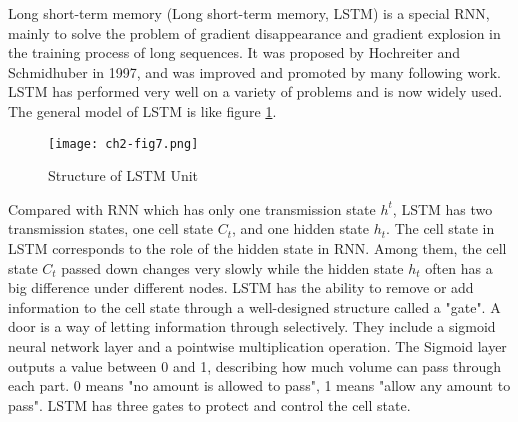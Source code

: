Long short-term memory (Long short-term memory, LSTM) is a special RNN, mainly to solve the problem of gradient disappearance and gradient explosion in the training process of long sequences. It was proposed by Hochreiter and Schmidhuber in 1997\cite{lstm1997}, and was improved and promoted by many following work. LSTM has performed very well on a variety of problems and is now widely used. The general model of LSTM is like figure \ref{ch2-fig7}.

\begin{figure}[h]
	\centering
	\texttt{[image: ch2-fig7.png]}
	\caption{Structure of LSTM Unit}
	\label{ch2-fig7}
\end{figure}


Compared with RNN which has only one transmission state \(h^t\), LSTM has two transmission states, one cell state \(C_t\), and one hidden state \(h_t\). The cell state in LSTM corresponds to the role of the hidden state in RNN. Among them, the cell state \(C_t\) passed down changes very slowly while the hidden state \(h_t\) often has a big difference under different nodes. LSTM has the ability to remove or add information to the cell state through a well-designed structure called a "gate". A door is a way of letting information through selectively. They include a sigmoid neural network layer and a pointwise multiplication operation. The Sigmoid layer outputs a value between 0 and 1, describing how much volume can pass through each part. 0 means "no amount is allowed to pass", 1 means "allow any amount to pass". LSTM has three gates to protect and control the cell state.

